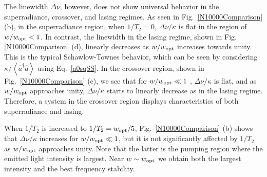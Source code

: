 \documentclass[aps,
twocolumn,
showpacs,
superscriptaddress,groupedaddress]{revtex4}
\begin{document}
The linewidth $\Delta \nu$, however, does not show universal behavior in
the superradiance, crossover, and lasing regimes. As seen in
Fig.~\ref{N10000Comparison} (b), in the superradiance region, when
$1/T_2=0$, $\Delta \nu / \kappa$ is flat in the region of $w/w_{\rm opt}<1$.
In contrast, the linewidth in the lasing regime, shown in
Fig.\ref{N10000Comparison} (d), linearly decreases as $w/w_{\rm opt}$
increases towards unity. This is the typical Schawlow-Townes behavior,
which can be seen by considering
$\kappa/\left<\hat{a}^{\dagger}\hat{a}\right>$ using Eq.~\ref{a0sqSS}.
In the crossover region, shown in Fig.~\ref{N10000Comparison} (c), we
see that for $w/w_{\rm opt}\ll 1$ , $\Delta \nu/\kappa$ is flat, and as
$w/w_{\rm opt}$ approaches unity, $\Delta \nu/\kappa$ starts to linearly
decrease as in the lasing regime. Therefore, a system in the crossover
region displays characteristics of both superradiance and lasing. 

When $1/T_2$ is increased to $1/T_2=w_{\rm opt}/5$,
Fig.~\ref{N10000Comparison} (b) shows that $\Delta \nu/\kappa$ increases
for $w/w_{\rm opt}\ll 1$, but it is not significantly affected by $1/T_2$ as
$w/w_{\rm opt}$ approaches unity.  Note that the latter is the pumping
region where the emitted light intensity is largest.  Near $w\sim w_{\rm
opt}$ we obtain both the largest intensity and the best frequency
stability.
\end{document}
